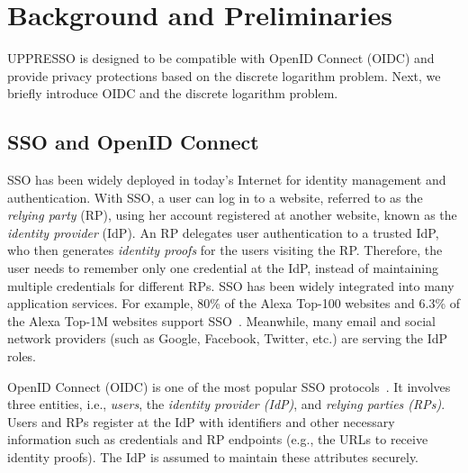 \section{Background and Preliminaries}
\label{sec:background}
UPPRESSO is designed to be compatible with OpenID Connect (OIDC) and provide privacy protections based on the discrete logarithm problem. Next, we briefly introduce OIDC and the discrete logarithm problem.

\subsection{SSO and OpenID Connect}
\label{subsec:OIDC}
SSO has been widely deployed in today's Internet for identity management and authentication. With SSO, a user can log in to a website, referred to as the \emph{relying party} (RP), using her account registered at another website, known as the \emph{identity provider} (IdP). An RP delegates user authentication to a trusted IdP, who then generates \emph{identity proofs} for the users visiting the RP. Therefore, the user needs to remember only one credential at the IdP, instead of maintaining multiple credentials for different RPs.
SSO has been widely integrated into many application services.
For example, 80\% of the Alexa Top-100 websites and 6.3\% of the Alexa Top-1M websites support SSO~\cite{GhasemisharifRC18}.
Meanwhile, many email and social network providers (such as Google, Facebook, Twitter, etc.) are serving the IdP roles. %

OpenID Connect (OIDC) is one of the most popular SSO protocols~\cite{OpenIDConnect}. %
It involves three entities, i.e., {\em users}, the {\em identity provider (IdP)}, and {\em relying parties (RPs)}.
Users and RPs register at the IdP with identifiers %
and other necessary information such as credentials and RP endpoints (e.g., the URLs to receive identity proofs).
The IdP is assumed to maintain these attributes securely.

